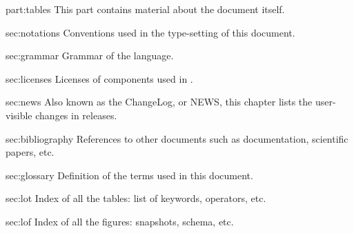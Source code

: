 
\begin{partDescription}{part:tables}
  {
    This part contains material about the document itself.
  }
\item[sec:notations]%
  Conventions used in the type-setting of this document.

\item[sec:grammar]%
  Grammar of the \us language.

\item[sec:licenses]%
  Licenses of components used in \usdk.

\item[sec:news]%
  Also known as the \urbi ChangeLog, or \urbi NEWS, this chapter lists the
  user-visible changes in \usdk releases.

\item[sec:bibliography]%
  References to other documents such as documentation, scientific papers,
  etc.

\item[sec:glossary]%
  Definition of the terms used in this document.

\item[sec:lot]%
  Index of all the tables: list of keywords, operators, etc.

\item[sec:lof]%
  Index of all the figures: snapshots, schema, etc.

\end{partDescription}


